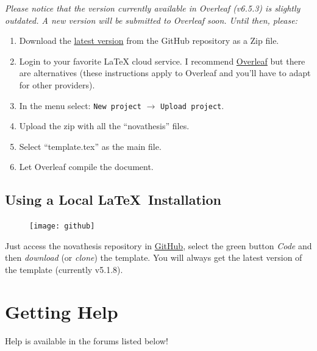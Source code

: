 \bgroup
  \itshape
  Please notice that the version currently available in Overleaf (v6.5.3) is slightly outdated. A new version will be submitted to Overleaf soon.  Until then, please:
  \begin{enumerate}
    \item Download the \href{https://github.com/joaomlourenco/novathesis/archive/master.zip}{latest version} from the GitHub repository as a Zip file.
    \item Login to your favorite LaTeX cloud service. I recommend \href{https://www.overleaf.com/?r=f5160636&rm=d&rs=b}{Overleaf} but there are alternatives (these instructions apply to Overleaf and you'll have to adapt for other providers).
    \item In the menu select: \texttt{New project} $\rightarrow$ \texttt{Upload project}.
    \item Upload the zip with all the “novathesis” files.
    \item Select “template.tex” as the main file.
    \item Let Overleaf compile the document.
  \end{enumerate}
\egroup

\subsection{Using a Local \LaTeX\ Installation}
\label{sub:using_local_latex}

\begin{figure}
\vspace*{-15ex}\texttt{[image: github]}%
\end{figure}

Just access the \gls{novathesis} repository in \href{https://github.com/joaomlourenco/novathesis}{GitHub}, select the green button \emph{Code} and then \emph{download} (or \emph{clone}) the template.  You will always get the latest version of the template (currently v5.1.8).


\section{Getting Help}
\label{sec:getting_help}

Help is available in the forums listed below!

\begin{center}  
\end{center}
 
